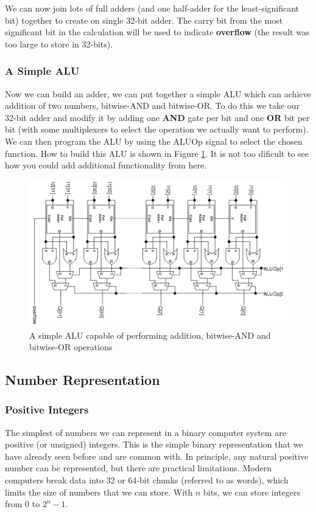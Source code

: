 \documentclass{article}
\begin{document}
	We can now join lots of full adders (and one half-adder for the least-significant bit) together to create on single 32-bit adder. The carry bit from the most significant bit in the calculation will be used to indicate \textbf{overflow} (the result was too large to store in 32-bits).
	
	\subsubsection{A Simple ALU}
	Now we can build an adder, we can put together a simple ALU which can achieve addition of two numbers, bitwise-AND and bitwise-OR. To do this we take our 32-bit adder and modify it by adding one \textbf{AND} gate per bit and one \textbf{OR} bit per bit (with some multiplexers to select the operation we actually want to perform). We can then program the ALU by using the ALUOp signal to select the chosen function. How to build this ALU is shown in Figure \ref{fig:simple ALU}. It is not too dificult to see how you could add additional functionality from here.
	
	\begin{figure}[ht]
		\centering
		\includegraphics[width=1\textwidth]{simple_ALU}
		\caption{A simple ALU capable of performing addition, bitwise-AND and bitwise-OR operations}
		\label{fig:simple ALU}
	\end{figure}	
	
	\subsection{Number Representation}
	\subsubsection{Positive Integers}
	The simplest of numbers we can represent in a binary computer system are positive (or unsigned) integers. This is the simple binary representation that we have already seen before and are common with. In principle, any natural positive number can be represented, but there are practical limitations. Modern computers break data into 32 or 64-bit chunks (referred to as words), which limits the size of numbers that we can store. With $n$ bits, we can store integers from 0 to $2^{n} - 1$.
	
\end{document}
